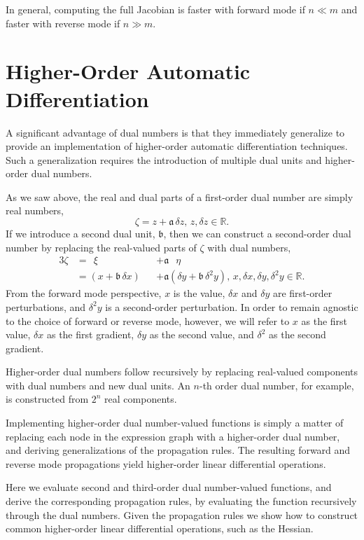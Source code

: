 In general, computing the full Jacobian is faster with forward mode if $n \ll m$ 
and faster with reverse mode if $n \gg m$.

\section{Higher-Order Automatic Differentiation}

A significant advantage of dual numbers is that they immediately generalize to provide
an implementation of higher-order automatic differentiation techniques.  Such a
generalization requires the introduction of multiple dual units and higher-order dual
numbers.

As we saw above, the real and dual parts of a first-order dual number are simply real 
numbers,
%
\begin{equation*}
\zeta = z + \mathfrak{a} \, \delta z, \, z, \delta z \in \mathbb{R}.
\end{equation*}
%
If we introduce a second dual unit, $\mathfrak{b}$, then we can construct a second-order 
dual number by replacing the real-valued parts of $\zeta$ with dual numbers,
%
\begin{alignat*}{3}
\zeta
&=
\;\, \xi
&&+ \mathfrak{a} \;\;\, \eta
\\
&=
\left( x + \mathfrak{b} \, \delta x \right)
&&+ \mathfrak{a} \left( \delta y + \mathfrak{b} \, \delta^{2} y \right), 
\, x, \delta x, \delta y, \delta^{2} y \in \mathbb{R}.
\end{alignat*}
%
From the forward mode perspective, $x$ is the value, $\delta x$ and $\delta y$ are 
first-order perturbations, and $\delta^{2} y$ is a second-order perturbation.  In order
to remain agnostic to the choice of forward or reverse mode, however, we will refer
to $x$ as the first value, $\delta x$ as the first gradient, $\delta y$ as the second
value, and $\delta^{2}$ as the second gradient.

Higher-order dual numbers follow recursively by replacing real-valued components 
with dual numbers and new dual units.  An $n$-th order dual number, for example, 
is constructed from $2^{n}$ real components.

Implementing higher-order dual number-valued functions is simply a matter of
replacing each node in the expression graph with a higher-order dual number,
and deriving generalizations of the propagation rules.   The resulting forward and 
reverse mode propagations yield higher-order linear differential operations.

Here we evaluate second and third-order dual number-valued functions, and derive the corresponding
propagation rules, by evaluating the function recursively through the dual numbers.  Given the
propagation rules we show how to construct common higher-order linear differential operations,
such as the Hessian.
 

